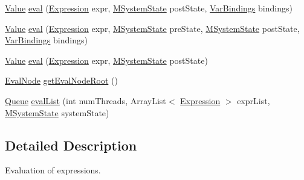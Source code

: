 \begin{DoxyCompactItemize}
\item 
\hyperlink{classorg_1_1tzi_1_1use_1_1uml_1_1ocl_1_1value_1_1_value}{Value} \hyperlink{classorg_1_1tzi_1_1use_1_1uml_1_1ocl_1_1expr_1_1_evaluator_ac1121d79359ea21f1bb2189d82dfdd1f}{eval} (\hyperlink{classorg_1_1tzi_1_1use_1_1uml_1_1ocl_1_1expr_1_1_expression}{Expression} expr, \hyperlink{classorg_1_1tzi_1_1use_1_1uml_1_1sys_1_1_m_system_state}{M\-System\-State} post\-State, \hyperlink{classorg_1_1tzi_1_1use_1_1uml_1_1ocl_1_1value_1_1_var_bindings}{Var\-Bindings} bindings)
\item 
\hyperlink{classorg_1_1tzi_1_1use_1_1uml_1_1ocl_1_1value_1_1_value}{Value} \hyperlink{classorg_1_1tzi_1_1use_1_1uml_1_1ocl_1_1expr_1_1_evaluator_a650cb0d2fa18716b2a072e6ce16ea0c4}{eval} (\hyperlink{classorg_1_1tzi_1_1use_1_1uml_1_1ocl_1_1expr_1_1_expression}{Expression} expr, \hyperlink{classorg_1_1tzi_1_1use_1_1uml_1_1sys_1_1_m_system_state}{M\-System\-State} pre\-State, \hyperlink{classorg_1_1tzi_1_1use_1_1uml_1_1sys_1_1_m_system_state}{M\-System\-State} post\-State, \hyperlink{classorg_1_1tzi_1_1use_1_1uml_1_1ocl_1_1value_1_1_var_bindings}{Var\-Bindings} bindings)
\item 
\hyperlink{classorg_1_1tzi_1_1use_1_1uml_1_1ocl_1_1value_1_1_value}{Value} \hyperlink{classorg_1_1tzi_1_1use_1_1uml_1_1ocl_1_1expr_1_1_evaluator_a4703b38c872d357c8be2e9e342f9ad15}{eval} (\hyperlink{classorg_1_1tzi_1_1use_1_1uml_1_1ocl_1_1expr_1_1_expression}{Expression} expr, \hyperlink{classorg_1_1tzi_1_1use_1_1uml_1_1sys_1_1_m_system_state}{M\-System\-State} post\-State)
\item 
\hyperlink{classorg_1_1tzi_1_1use_1_1uml_1_1ocl_1_1expr_1_1_eval_node}{Eval\-Node} \hyperlink{classorg_1_1tzi_1_1use_1_1uml_1_1ocl_1_1expr_1_1_evaluator_aaddb9afa691d7d6335546b5f03a90447}{get\-Eval\-Node\-Root} ()
\item 
\hyperlink{classorg_1_1tzi_1_1use_1_1util_1_1collections_1_1_queue}{Queue} \hyperlink{classorg_1_1tzi_1_1use_1_1uml_1_1ocl_1_1expr_1_1_evaluator_a3ea6c89be8a1d1e5904befd51a5802b8}{eval\-List} (int num\-Threads, Array\-List$<$ \hyperlink{classorg_1_1tzi_1_1use_1_1uml_1_1ocl_1_1expr_1_1_expression}{Expression} $>$ expr\-List, \hyperlink{classorg_1_1tzi_1_1use_1_1uml_1_1sys_1_1_m_system_state}{M\-System\-State} system\-State)
\end{DoxyCompactItemize}


\subsection{Detailed Description}
Evaluation of expressions.

